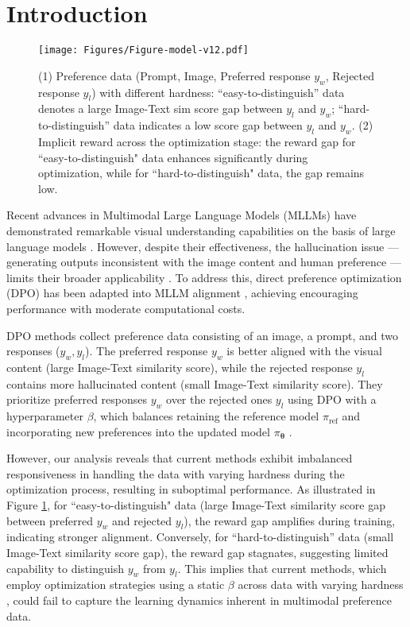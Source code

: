 \section{Introduction}
\label{sec:intro}

\begin{figure}[t]
\vskip 0.2in
\begin{center}
\centerline{\texttt{[image: Figures/Figure-model-v12.pdf]}}
\caption{ (1) Preference data (Prompt, Image, Preferred response $y_w$, Rejected response $y_l$) with different hardness: ``easy-to-distinguish'' data denotes a large Image-Text sim score gap between $y_l$ and $y_w$; ``hard-to-distinguish'' data indicates a low score gap between $y_l$ and $y_w$.
(2) Implicit reward across the optimization stage: the reward gap for ``easy-to-distinguish" data enhances significantly during optimization, while for ``hard-to-distinguish" data, the gap remains low.}
\label{fig:figure-1}
\end{center}
\vskip -0.2in
\end{figure}

Recent advances in Multimodal Large Language Models (MLLMs) have demonstrated remarkable visual understanding capabilities on the basis of large language models \cite{LLaVA, InternVL, QwenVL}. 
However, despite their effectiveness, the hallucination issue --- generating outputs inconsistent with the image content and human preference --- limits their broader applicability \cite{VCD, LRV-Instruction, RLHF-V}. 
To address this, direct preference optimization (DPO) \cite{DPO} has been adapted into MLLM alignment \cite{RLAIF-V, mDPO, CLIP-DPO}, achieving encouraging performance with moderate computational costs.

DPO methods \cite{LLaVA-RLHF, RLAIF-V} collect preference data consisting of an image, a prompt, and two responses ($y_w, y_l$). The preferred response $y_w$ is better aligned with the visual content (large Image-Text similarity score), while the rejected response $y_l$ contains more hallucinated content (small Image-Text similarity score). 
They prioritize preferred responses $y_w$ over the rejected ones $y_l$ using DPO with a hyperparameter $\beta$, which balances retaining the reference model $\pi_\text{ref}$ and incorporating new preferences into the updated model $\pi_{\bm{\theta}}$ \cite{TPO, V-dpo}.

However, our analysis reveals that current methods exhibit imbalanced responsiveness in handling the data with varying hardness during the optimization process, resulting in suboptimal performance.
As illustrated in Figure \ref{fig:figure-1}, for ``easy-to-distinguish" data (large Image-Text similarity score gap between preferred $y_w$ and rejected $y_l$), the reward gap amplifies during training, indicating stronger alignment.
Conversely, for ``hard-to-distinguish'' data (small Image-Text similarity score gap), the reward gap stagnates, suggesting limited capability to distinguish $y_w$ from $y_l$. 
This implies that current methods, which employ optimization strategies using a static $\beta$ across data with varying hardness \cite{LLaVA-RLHF, RLAIF-V}, could fail to capture the learning dynamics inherent in multimodal preference data.

